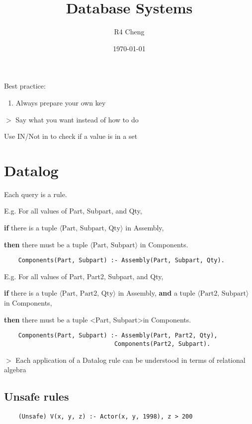\documentclass[12pt,a4paper]{article}
\title{Database Systems}
\author{R4 Cheng}
\date{\today}
\newcommand{\remark}[1]{
    $>$ {\color{blue} #1}
}
\begin{document}
\maketitle

Best practice:

\begin{enumerate}
    \item Always prepare your own key
\end{enumerate}

\remark{Say what you want instead of how to do}

Use IN/Not in to check if a value is in a set

\section*{Datalog}

Each query is a rule.

E.g. For all values of Part, Subpart, and Qty,

\textbf{if} there is a tuple \(\langle \text{Part, Subpart, Qty} \rangle\) in Assembly,

\textbf{then} there must be a tuple \(\langle \text{Part, Subpart} \rangle\) in Components.

\begin{verbatim}
    Components(Part, Subpart) :- Assembly(Part, Subpart, Qty).
\end{verbatim}

E.g. For all values of Part, Part2, Subpart, and Qty,

\textbf{if} there is a tuple \(\langle \text{Part, Part2, Qty} \rangle\) in Assembly, 
\textbf{and} a tuple \(\langle \text{Part2, Subpart} \rangle\) in Components,

\textbf{then} there must be a tuple \textless Part, Subpart\textgreater in Components.

\begin{verbatim}
    Components(Part, Subpart) :- Assembly(Part, Part2, Qty), 
                               Components(Part2, Subpart).
\end{verbatim}

\remark{Each application of a Datalog rule can be understood in terms of relational algebra}

\subsection*{Unsafe rules}

\begin{verbatim}
    (Unsafe) V(x, y, z) :- Actor(x, y, 1998), z > 200
\end{verbatim}
\end{document}
